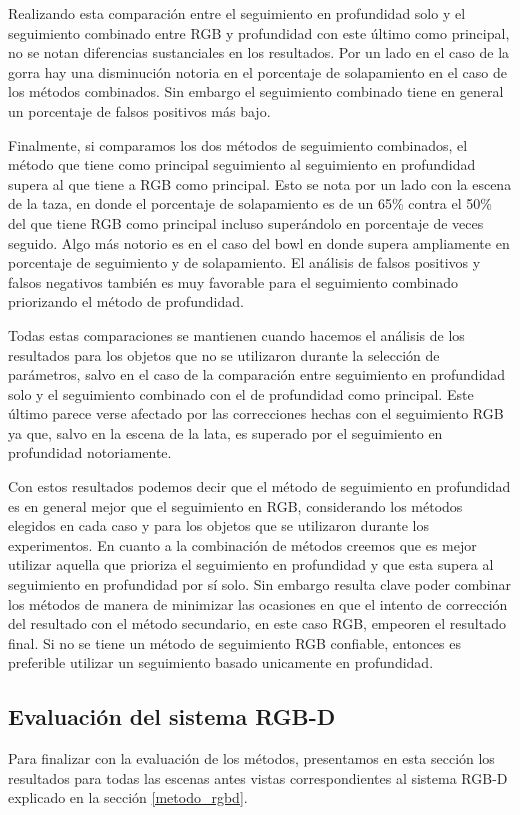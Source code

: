 Realizando esta comparación entre el seguimiento en profundidad solo y el seguimiento combinado entre RGB y profundidad con este último como principal, no se notan diferencias sustanciales en los resultados. Por un lado en el caso de la gorra hay una disminución notoria en el porcentaje de solapamiento en el caso de los métodos combinados. Sin embargo el seguimiento combinado tiene en general un porcentaje de falsos positivos más bajo.

Finalmente, si comparamos los dos métodos de seguimiento combinados, el método que tiene como principal seguimiento al seguimiento en profundidad supera al que tiene a RGB como principal. Esto se nota por un lado con la escena de la taza, en donde el porcentaje de solapamiento es de un 65\% contra el 50\% del que tiene RGB como principal incluso superándolo en porcentaje de veces seguido. Algo más notorio es en el caso del bowl en donde supera ampliamente en porcentaje de seguimiento y de solapamiento. El análisis de falsos positivos y falsos negativos también es muy favorable para el seguimiento combinado priorizando el método de profundidad.

Todas estas comparaciones se mantienen cuando hacemos el análisis de los resultados para los objetos que no se utilizaron durante la selección de parámetros, salvo en el caso de la comparación entre seguimiento en profundidad solo y el seguimiento combinado con el de profundidad como principal. Este último parece verse afectado por las correcciones hechas con el seguimiento RGB ya que, salvo en la escena de la lata, es superado por el seguimiento en profundidad notoriamente.

Con estos resultados podemos decir que el método de seguimiento en profundidad es en general mejor que el seguimiento en RGB, considerando los métodos elegidos en cada caso y para los objetos que se utilizaron durante los experimentos. En cuanto a la combinación de métodos creemos que es mejor utilizar aquella que prioriza el seguimiento en profundidad y que esta supera al seguimiento en profundidad por sí solo. Sin embargo resulta clave poder combinar los métodos de manera de minimizar las ocasiones en que el intento de corrección del resultado con el método secundario, en este caso RGB, empeoren el resultado final. Si no se tiene un método de seguimiento RGB confiable, entonces es preferible utilizar un seguimiento basado unicamente en profundidad.


\subsection{Evaluación del sistema RGB-D}\label{sec:evaluacion_rgbd}
Para finalizar con la evaluación de los métodos, presentamos en esta sección los resultados para todas las escenas antes vistas correspondientes al sistema RGB-D explicado en la sección \ref{metodo_rgbd}.


